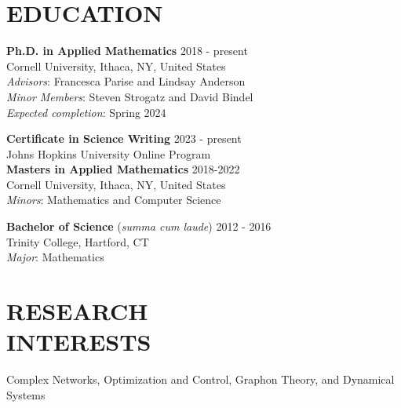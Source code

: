 \documentclass[margin]{res} %
\begin{document}
\begin{resume}

\section{EDUCATION}  
\textbf{Ph.D. in Applied Mathematics} \hfill 2018 - present\\
Cornell University, Ithaca, NY, United States\\
\textit{Advisors}: Francesca Parise and Lindsay Anderson \\
\textit{Minor Members}: Steven Strogatz and David Bindel\\
\textit{Expected completion}: Spring 2024
\smallskip

\textbf{Certificate in Science Writing} \hfill 2023 - present\\
Johns Hopkins University Online Program\\

\textbf{Masters in Applied Mathematics} \hfill 2018-2022\\
Cornell University, Ithaca, NY, United States\\
\textit{Minors}: Mathematics and Computer Science
\smallskip

\textbf{Bachelor of Science} (\textit{summa cum laude}) \hfill 2012 - 2016 \\
Trinity College, Hartford, CT\\
\textit{Major}: Mathematics\\



\section{RESEARCH \\ INTERESTS} 
Complex Networks, Optimization and Control, Graphon Theory, and Dynamical Systems 


\end{resume}
\end{document}
